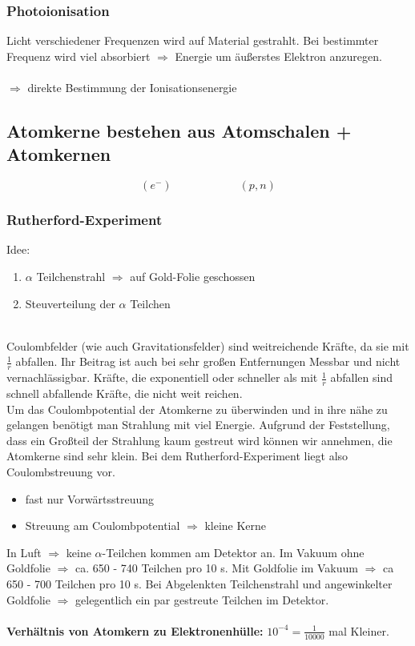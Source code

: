 
\subsubsection{Photoionisation}

Licht verschiedener Frequenzen wird auf Material gestrahlt. Bei bestimmter Frequenz wird viel absorbiert $ \Rightarrow $ Energie um äußerstes Elektron anzuregen.\\[5pt]
\\
$ \Rightarrow $ direkte Bestimmung der Ionisationsenergie

\subsection{Atomkerne bestehen aus Atomschalen + Atomkernen}

\begin{equation*}
(e^-) \qquad \qquad \qquad (p,n)
\end{equation*}

\subsubsection{Rutherford-Experiment}

Idee:
\begin{enumerate}[1)]
	\item $ \alpha $ Teilchenstrahl $ \Rightarrow $ auf Gold-Folie geschossen
	\item Steuverteilung der $ \alpha $ Teilchen
\end{enumerate}
\\
Coulombfelder (wie auch Gravitationsfelder) sind weitreichende Kräfte, da sie mit $ \frac{1}{r} $ abfallen. Ihr Beitrag ist auch bei sehr großen Entfernungen Messbar und nicht vernachlässigbar. Kräfte, die exponentiell oder schneller als mit $ \frac{1}{r} $ abfallen sind schnell abfallende Kräfte, die nicht weit reichen.\\
Um das Coulombpotential der Atomkerne zu überwinden und in ihre nähe zu gelangen benötigt man Strahlung mit viel Energie. Aufgrund der Feststellung, dass ein Großteil der Strahlung kaum gestreut wird können wir annehmen, die Atomkerne sind sehr klein. Bei dem Rutherford-Experiment liegt also Coulombstreuung vor.
\begin{itemize}
	\item fast nur Vorwärtsstreuung
	\item Streuung am Coulombpotential $ \Rightarrow $ kleine Kerne
\end{itemize}
In Luft $ \Rightarrow $ keine $ \alpha $-Teilchen kommen am Detektor an. Im Vakuum ohne Goldfolie $ \Rightarrow $ ca. 650 - 740 Teilchen pro 10 s. Mit Goldfolie im Vakuum $ \Rightarrow $ ca 650 - 700 Teilchen pro 10 s. Bei Abgelenkten Teilchenstrahl und angewinkelter Goldfolie $ \Rightarrow $ gelegentlich ein par gestreute Teilchen im Detektor.\\
\\
\textbf{Verhältnis von Atomkern zu Elektronenhülle:} $ 10^{-4} = \frac{1}{10000} $ mal Kleiner.

